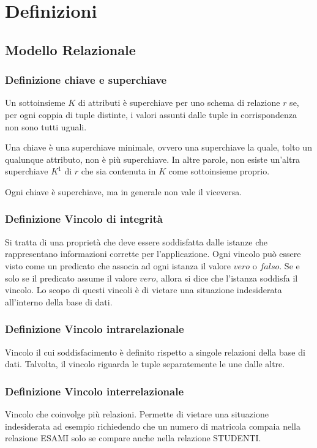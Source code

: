 \section{Definizioni}
\subsection{Modello Relazionale}
\subsubsection{Definizione chiave e superchiave}

Un sottoinsieme $K$ di attributi è superchiave per uno schema di relazione $r$
se, per ogni coppia di tuple distinte, i valori assunti dalle
tuple in corrispondenza non sono tutti uguali.

\noindent
Una chiave è una superchiave minimale, ovvero una superchiave la quale,
tolto un qualunque attributo, non è più superchiave. In altre parole, non
esiste un'altra superchiave $K^1$ di $r$ che sia contenuta in $K$ come sottoinsieme proprio.

\noindent
Ogni chiave è superchiave,
ma in generale non vale il viceversa.

\subsubsection{Definizione Vincolo di integrità}

Si tratta di una proprietà che deve essere soddisfatta dalle istanze che rappresentano
informazioni corrette per l'applicazione. Ogni vincolo può essere visto come un predicato
che associa ad ogni istanza il valore $vero$ o $falso$. Se e solo se il predicato assume
il valore $vero$, allora si dice che l'istanza soddisfa il vincolo.
Lo scopo di questi vincoli è di vietare una situazione indesiderata all'interno della
base di dati.

\subsubsection{Definizione Vincolo intrarelazionale}
Vincolo il cui soddisfacimento è definito rispetto a singole relazioni della base di dati.
Talvolta, il vincolo riguarda le tuple separatemente le une dalle altre.

\subsubsection{Definizione Vincolo interrelazionale}
Vincolo che coinvolge più relazioni. Permette di vietare una situazione indesiderata ad esempio
richiedendo che un numero di matricola compaia nella relazione ESAMI solo se compare anche
nella relazione STUDENTI.


